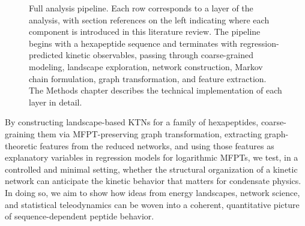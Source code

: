 \begin{figure}[htbp]
\caption{Full analysis pipeline. Each row corresponds to a layer of the
  analysis, with section references on the left indicating where each component
  is introduced in this literature review. The pipeline begins with a
  hexapeptide sequence and terminates with regression-predicted kinetic
  observables, passing through coarse-grained modeling, landscape exploration,
  network construction, Markov chain formulation, graph transformation, and
  feature extraction. The Methods chapter describes the technical implementation
  of each layer in detail.}
\label{fig:methodology-pipeline}
\end{figure}

By constructing landscape-based KTNs for a family of hexapeptides,
coarse-graining them via MFPT-preserving graph transformation, extracting
graph-theoretic features from the reduced networks, and using those features as
explanatory variables in regression models for logarithmic MFPTs, we test, in a
controlled and minimal setting, whether the structural organization of a
kinetic network can anticipate the kinetic behavior that matters for condensate
physics. In doing so, we aim to show how ideas from energy landscapes, network
science, and statistical teleodynamics can be woven into a coherent,
quantitative picture of sequence-dependent peptide behavior.
